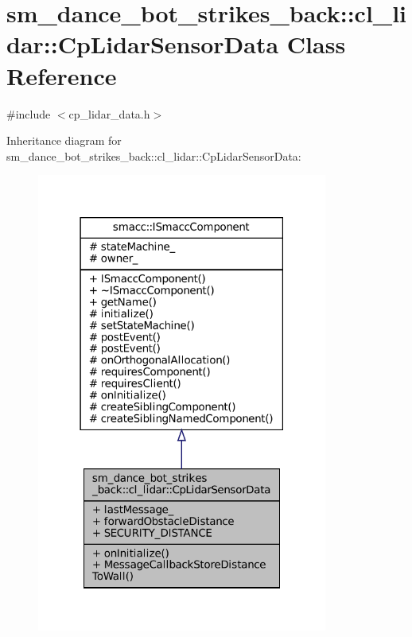 \hypertarget{classsm__dance__bot__strikes__back_1_1cl__lidar_1_1CpLidarSensorData}{}\section{sm\+\_\+dance\+\_\+bot\+\_\+strikes\+\_\+back\+:\+:cl\+\_\+lidar\+:\+:Cp\+Lidar\+Sensor\+Data Class Reference}
\label{classsm__dance__bot__strikes__back_1_1cl__lidar_1_1CpLidarSensorData}


{\ttfamily \#include $<$cp\+\_\+lidar\+\_\+data.\+h$>$}



Inheritance diagram for sm\+\_\+dance\+\_\+bot\+\_\+strikes\+\_\+back\+:\+:cl\+\_\+lidar\+:\+:Cp\+Lidar\+Sensor\+Data\+:
\nopagebreak
\begin{figure}[H]
\begin{center}
\leavevmode
\includegraphics[width=271pt]{classsm__dance__bot__strikes__back_1_1cl__lidar_1_1CpLidarSensorData__inherit__graph}
\end{center}
\end{figure}


